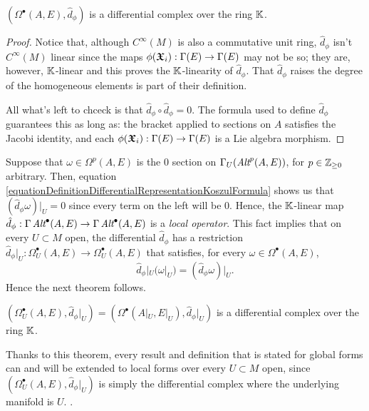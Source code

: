 \begin{proposition} \label{propositionEValuedFormsOnAIsDifferentialComplex}
 $(\Omega^\bullet(A, E), \hat d_\phi)$ is a differential complex over the ring $\mathbb{K}$. 
\end{proposition}

\begin{proof}
Notice that, although $C^\infty(M)$ is also a commutative unit ring, $\hat d_\phi$ isn't $C^\infty(M)$ linear since the maps $\phi(\sectoid X_i): \Gamma(E) \to \Gamma(E)$ may not be so; they are, however, $\mathbb{K}$-linear and this proves the $\mathbb{K}$-linearity of $\hat d_\phi$. That $\hat d_\phi$ raises the degree of the homogeneous elements is part of their definition. 

All what's left to chceck is that $\hat d_\phi \circ \hat d_\phi = 0$. The formula used to define $\hat d_\phi$ guarantees this as long as: the bracket applied to sections on $A$ satisfies the Jacobi identity, and each $\phi(\sectoid X_i): \Gamma(E) \to \Gamma(E)$ is a Lie algebra morphism.
\end{proof}

Suppose that $\omega \in \Omega^p(A, E)$ is the $0$ section on $\Gamma_U(\operatorname{\textit{Alt}}^p(A, E))$, for $p \in \mathbb{Z}_{\geq 0}$ arbitrary. Then, equation \ref{equationDefinitionDifferentialRepresentationKoszulFormula} shows us that $(\hat d_\phi \omega)|_U = 0$ since every term on the left will be $0$. Hence, the $\mathbb{K}$-linear map $\hat d_\phi : \Gamma \Alt^\bullet(A, E) \to \Gamma \Alt^\bullet(A, E)$ is a \emph{local operator}. This fact implies that on every $U \subset M$ open, the differential $\hat d_\phi$ has a restriction $\hat d_\phi|_U: \Omega_U^\bullet(A, E) \to \Omega_U^\bullet(A, E)$ that satisfies, for every $\omega \in \Omega^\bullet(A, E)$, 
    \begin{equation} \label{equationRestrictionOfDifferentialLocalOperatorGoodRestriction}
        \hat d_\phi|_U( \omega|_U) = (\hat d_\phi \omega)|_U.
    \end{equation} 
Hence the next theorem follows.

\begin{theorem}
$(\Omega_U^\bullet(A, E), \hat d_\phi|_U)  = (\Omega^\bullet(A|_U, E|_U), \hat d_\phi|_U)$ is a differential complex over the ring $\mathbb{K}$.
\end{theorem}

\begin{remark}\label{remarkEveryResultAboutDIfferentialComplexExtendedLOcally}
Thanks to this theorem, every result and definition that is stated for global forms can and will be extended to local forms over every $U \subset M$ open, since $(\Omega_U^\bullet(A, E), \hat d_\phi|_U)$ is simply the differential complex where the underlying manifold is $U$. .
\end{remark}

